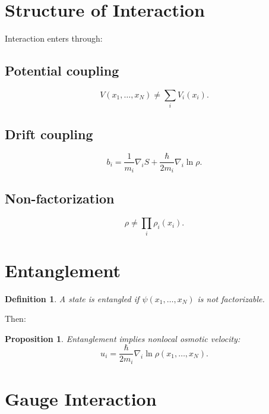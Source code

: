 \documentclass[11pt]{article}
\newtheorem{proposition}{Proposition}
\newtheorem{definition}{Definition}
\begin{document}
\section{Structure of Interaction}

Interaction enters through:

\subsection{Potential coupling}
\begin{equation}
V(x_1,\dots,x_N) \neq \sum_i V_i(x_i).
\end{equation}

\subsection{Drift coupling}

\begin{equation}
b_i = \frac{1}{m_i} \nabla_i S + \frac{\hbar}{2m_i} \nabla_i \ln \rho.
\end{equation}

\subsection{Non-factorization}

\begin{equation}
\rho \neq \prod_i \rho_i(x_i).
\end{equation}

\section{Entanglement}

\begin{definition}
A state is entangled if $\psi(x_1,\dots,x_N)$ is not factorizable.
\end{definition}

Then:

\begin{proposition}
Entanglement implies nonlocal osmotic velocity:
\begin{equation}
u_i = \frac{\hbar}{2m_i} \nabla_i \ln \rho(x_1,\dots,x_N).
\end{equation}
\end{proposition}

\section{Gauge Interaction}
\end{document}
